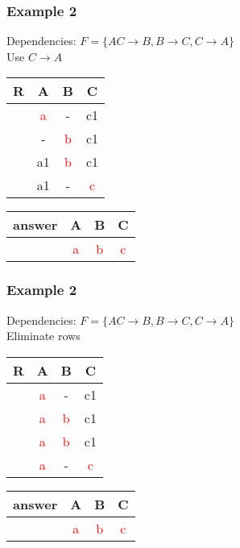 \documentclass{beamer}
\begin{document}
\begin{frame}
  \frametitle{Example 2}
  Dependencies: $F = \{AC \rightarrow B, B \rightarrow C, C \rightarrow A \}$\\
  Use $C \rightarrow A$\\
  \begin{tabular}{ c | c c c}
  R & A & B & C \\
  \hline
  & \textcolor{red}{a}  & -  & c1 \\
  & -  & \textcolor{red}{b}  & c1 \\
  & a1 & \textcolor{red}{b} & c1 \\
  & a1 & - & \textcolor{red}{c} \\
  \end{tabular}
  \begin{tabular}{ c | c c c}
  answer & A & B & C \\
  \hline
   & \textcolor{red}{a}& \textcolor{red}{b}& \textcolor{red}{c}\\
  \end{tabular}
\end{frame}

\begin{frame}
  \frametitle{Example 2}
  Dependencies: $F = \{AC \rightarrow B, B \rightarrow C, C \rightarrow A \}$\\
  Eliminate rows\\
  \begin{tabular}{ c | c c c}
  R & A & B & C \\
  \hline
  & \textcolor{red}{a}  & -  & c1 \\
  & \textcolor{red}{a}  & \textcolor{red}{b}  & c1 \\
  & \textcolor{red}{a}  & \textcolor{red}{b} & c1 \\
  & \textcolor{red}{a}  & - & \textcolor{red}{c} \\
  \end{tabular}
  \begin{tabular}{ c | c c c}
  answer & A & B & C \\
  \hline
   & \textcolor{red}{a}& \textcolor{red}{b}& \textcolor{red}{c}\\
  \end{tabular}
\end{frame}
\end{document}
